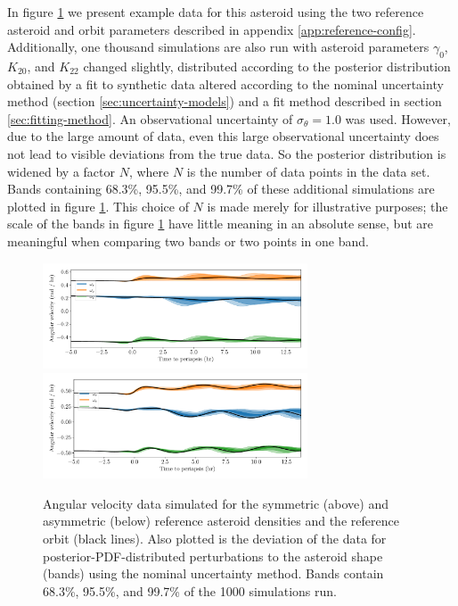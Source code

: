 \documentclass{aastex631}
\begin{document}
In figure \ref{fig:example-data} we present example data for this asteroid using the two reference asteroid and orbit parameters described in appendix \ref{app:reference-config}. Additionally, one thousand simulations are also run with asteroid parameters $\gamma_0$, $K_{20}$, and $K_{22}$ changed slightly, distributed according to the posterior distribution obtained by a fit to synthetic data altered according to the nominal uncertainty method (section \ref{sec:uncertainty-models}) and a fit method described in section \ref{sec:fitting-method}.  An observational uncertainty of $\sigma_\theta = 1.0$ was used. However, due to the large amount of data, even this large observational uncertainty does not lead to visible deviations from the true data. So the posterior distribution is widened by a factor $N$, where $N$ is the number of data points in the data set. Bands containing 68.3\%, 95.5\%, and 99.7\% of these additional simulations are plotted in figure \ref{fig:example-data}. This choice of $N$ is made merely for illustrative purposes; the scale of the bands in figure \ref{fig:example-data} have little meaning in an absolute sense, but are meaningful when comparing two bands or two points in one band.

\begin{figure}
  \centering
  \includegraphics[width=0.7\textwidth]{nominal-data-sym.pdf}
  \includegraphics[width=0.7\textwidth]{nominal-data-asym.pdf}
  \caption{Angular velocity data simulated for the symmetric (above) and asymmetric (below) reference asteroid densities and the reference orbit (black lines). Also plotted is the deviation of the data for posterior-PDF-distributed perturbations to the asteroid shape (bands) using the nominal uncertainty method. Bands contain 68.3\%, 95.5\%, and 99.7\% of the 1000 simulations run.}
  \label{fig:example-data}
\end{figure}
\end{document}
